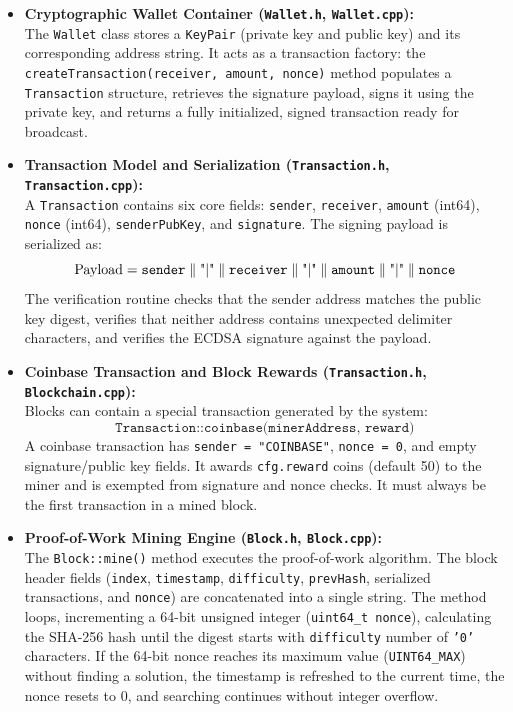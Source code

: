 \documentclass[11pt,a4paper]{report}
\begin{document}
\begin{itemize}
    \item \textbf{Cryptographic Wallet Container (\texttt{Wallet.h}, \texttt{Wallet.cpp}):}\\
    The \texttt{Wallet} class stores a \texttt{KeyPair} (private key and public key) and its corresponding address string. It acts as a transaction factory: the \texttt{createTransaction(receiver, amount, nonce)} method populates a \texttt{Transaction} structure, retrieves the signature payload, signs it using the private key, and returns a fully initialized, signed transaction ready for broadcast.

    \item \textbf{Transaction Model and Serialization (\texttt{Transaction.h}, \texttt{Transaction.cpp}):}\\
    A \texttt{Transaction} contains six core fields: \texttt{sender}, \texttt{receiver}, \texttt{amount} (int64), \texttt{nonce} (int64), \texttt{senderPubKey}, and \texttt{signature}.
    The signing payload is serialized as:
    \begin{equation*}
        \text{Payload} = \texttt{sender} \parallel \text{"\textbar"} \parallel \texttt{receiver} \parallel \text{"\textbar"} \parallel \texttt{amount} \parallel \text{"\textbar"} \parallel \texttt{nonce}
    \end{equation*}
    The verification routine checks that the sender address matches the public key digest, verifies that neither address contains unexpected delimiter characters, and verifies the ECDSA signature against the payload.

    \item \textbf{Coinbase Transaction and Block Rewards (\texttt{Transaction.h}, \texttt{Blockchain.cpp}):}\\
    Blocks can contain a special transaction generated by the system:
    \begin{equation*}
        \texttt{Transaction::coinbase(minerAddress, reward)}
    \end{equation*}
    A coinbase transaction has \texttt{sender = "COINBASE"}, \texttt{nonce = 0}, and empty signature/public key fields. It awards \texttt{cfg.reward} coins (default 50) to the miner and is exempted from signature and nonce checks. It must always be the first transaction in a mined block.

    \item \textbf{Proof-of-Work Mining Engine (\texttt{Block.h}, \texttt{Block.cpp}):}\\
    The \texttt{Block::mine()} method executes the proof-of-work algorithm. The block header fields (\texttt{index}, \texttt{timestamp}, \texttt{difficulty}, \texttt{prevHash}, serialized transactions, and \texttt{nonce}) are concatenated into a single string. The method loops, incrementing a 64-bit unsigned integer (\texttt{uint64\_t nonce}), calculating the SHA-256 hash until the digest starts with \texttt{difficulty} number of \texttt{'0'} characters. If the 64-bit nonce reaches its maximum value (\texttt{UINT64\_MAX}) without finding a solution, the timestamp is refreshed to the current time, the nonce resets to 0, and searching continues without integer overflow.


\end{itemize}
\end{document}
